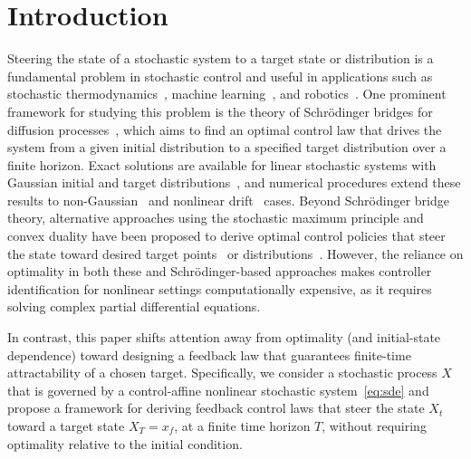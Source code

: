 \documentclass[letterpaper, 10 pt, conference]{ieeeconf}  %
\newcommand{\Ali}[1]{{\color{magenta}[Ali: #1]}}
\begin{document}
    \section{Introduction}
Steering the state of a stochastic system to a target state or distribution is a fundamental problem in stochastic control and useful in applications such as stochastic thermodynamics~\cite{peliti2021stochastic,chen2019stochastic,fu2021maximal}, machine learning~\cite{chen2023generative,domingo2024stochastic,rapakoulias2024go}, and robotics~\cite{shah2012stochastic,gorodetsky2018high,theodorou2011iterative,okamoto2019optimal,liu2024optimal}. 
One prominent framework for studying this problem is the  theory of Schr\"odinger bridges for diffusion processes~\cite{wakolbinger1990schrodinger,pavon1991free}, which aims to find an optimal control law that drives the system from a given initial distribution to a specified target distribution over a finite horizon. Exact solutions are available for linear stochastic systems with Gaussian initial and target distributions~\cite{chen2015optimal,chen2015part2,teter2024schr,teter2025markov}, and numerical procedures extend these results to non-Gaussian~\cite{liu2023generalized,mei2024flow} and nonlinear drift~\cite{caluya2021wasserstein} cases. 
Beyond Schr\"odinger bridge theory, alternative approaches using the stochastic maximum principle and convex duality have been proposed to derive optimal control policies that steer the state toward desired target  points~\cite{pakniyat2021steering, pakniyat2021partially} or distributions~\cite{pakniyat2022convex, pakniyat2024distributionally}.
{However, the reliance on optimality in both these and Schr\"odinger-based approaches makes controller identification for nonlinear settings computationally expensive, as it requires solving complex partial differential equations.}

In contrast, this paper shifts attention away from optimality (and initial-state dependence) toward designing a feedback law that guarantees finite-time attractability of a chosen target. Specifically, we consider a stochastic process $X$ that is governed by a control-affine nonlinear stochastic system~\eqref{eq:sde} and propose a framework for deriving feedback control laws that steer the state $X_t$ toward a target state $X_T=x_f$, at a finite time horizon $T$, without requiring optimality relative to the initial condition.
\end{document}
